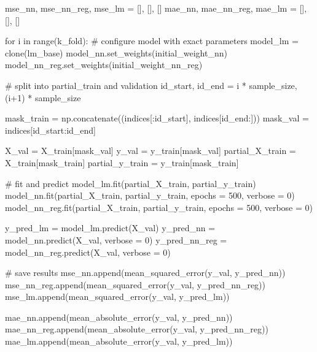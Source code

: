 \documentclass[
  letterpaper,
  DIV=11,
  numbers=noendperiod]{scrreprt}
\newenvironment{Shaded}{\begin{snugshade}}{\end{snugshade}}
\newcommand{\BuiltInTok}[1]{\textcolor[rgb]{0.00,0.23,0.31}{#1}}
\newcommand{\CommentTok}[1]{\textcolor[rgb]{0.37,0.37,0.37}{#1}}
\newcommand{\ControlFlowTok}[1]{\textcolor[rgb]{0.00,0.23,0.31}{#1}}
\newcommand{\DecValTok}[1]{\textcolor[rgb]{0.68,0.00,0.00}{#1}}
\newcommand{\KeywordTok}[1]{\textcolor[rgb]{0.00,0.23,0.31}{#1}}
\newcommand{\NormalTok}[1]{\textcolor[rgb]{0.00,0.23,0.31}{#1}}
\newcommand{\OperatorTok}[1]{\textcolor[rgb]{0.37,0.37,0.37}{#1}}
\begin{document}
\begin{Shaded}
\begin{Highlighting}[]
\NormalTok{mse\_nn, mse\_nn\_reg, mse\_lm }\OperatorTok{=}\NormalTok{ [], [], []}
\NormalTok{mae\_nn, mae\_nn\_reg, mae\_lm }\OperatorTok{=}\NormalTok{ [], [], []}

\ControlFlowTok{for}\NormalTok{ i }\KeywordTok{in} \BuiltInTok{range}\NormalTok{(k\_fold):}
    \CommentTok{\# configure model with exact parameters}
\NormalTok{    model\_lm }\OperatorTok{=}\NormalTok{ clone(lm\_base)}
\NormalTok{    model\_nn.set\_weights(initial\_weight\_nn)}
\NormalTok{    model\_nn\_reg.set\_weights(initial\_weight\_nn\_reg)}

    \CommentTok{\# split into partial\_train and validation}
\NormalTok{    id\_start, id\_end }\OperatorTok{=}\NormalTok{ i }\OperatorTok{*}\NormalTok{ sample\_size, (i}\OperatorTok{+}\DecValTok{1}\NormalTok{) }\OperatorTok{*}\NormalTok{ sample\_size}

\NormalTok{    mask\_train }\OperatorTok{=}\NormalTok{ np.concatenate((indices[:id\_start], indices[id\_end:]))}
\NormalTok{    mask\_val   }\OperatorTok{=}\NormalTok{ indices[id\_start:id\_end]}

\NormalTok{    X\_val }\OperatorTok{=}\NormalTok{ X\_train[mask\_val]}
\NormalTok{    y\_val }\OperatorTok{=}\NormalTok{ y\_train[mask\_val]}
\NormalTok{    partial\_X\_train }\OperatorTok{=}\NormalTok{ X\_train[mask\_train]}
\NormalTok{    partial\_y\_train }\OperatorTok{=}\NormalTok{ y\_train[mask\_train]}

    \CommentTok{\# fit and predict}
\NormalTok{    model\_lm.fit(partial\_X\_train, partial\_y\_train)}
\NormalTok{    model\_nn.fit(partial\_X\_train, partial\_y\_train, epochs }\OperatorTok{=} \DecValTok{500}\NormalTok{, verbose }\OperatorTok{=} \DecValTok{0}\NormalTok{)}
\NormalTok{    model\_nn\_reg.fit(partial\_X\_train, partial\_y\_train, epochs }\OperatorTok{=} \DecValTok{500}\NormalTok{, verbose }\OperatorTok{=} \DecValTok{0}\NormalTok{)}

\NormalTok{    y\_pred\_lm }\OperatorTok{=}\NormalTok{ model\_lm.predict(X\_val)}
\NormalTok{    y\_pred\_nn }\OperatorTok{=}\NormalTok{ model\_nn.predict(X\_val, verbose }\OperatorTok{=} \DecValTok{0}\NormalTok{)}
\NormalTok{    y\_pred\_nn\_reg }\OperatorTok{=}\NormalTok{ model\_nn\_reg.predict(X\_val, verbose }\OperatorTok{=} \DecValTok{0}\NormalTok{)}

    \CommentTok{\# save results}
\NormalTok{    mse\_nn.append(mean\_squared\_error(y\_val, y\_pred\_nn))}
\NormalTok{    mse\_nn\_reg.append(mean\_squared\_error(y\_val, y\_pred\_nn\_reg))}
\NormalTok{    mse\_lm.append(mean\_squared\_error(y\_val, y\_pred\_lm))}

\NormalTok{    mae\_nn.append(mean\_absolute\_error(y\_val, y\_pred\_nn))}
\NormalTok{    mae\_nn\_reg.append(mean\_absolute\_error(y\_val, y\_pred\_nn\_reg))}
\NormalTok{    mae\_lm.append(mean\_absolute\_error(y\_val, y\_pred\_lm))}
\end{Highlighting}
\end{Shaded}
\end{document}

